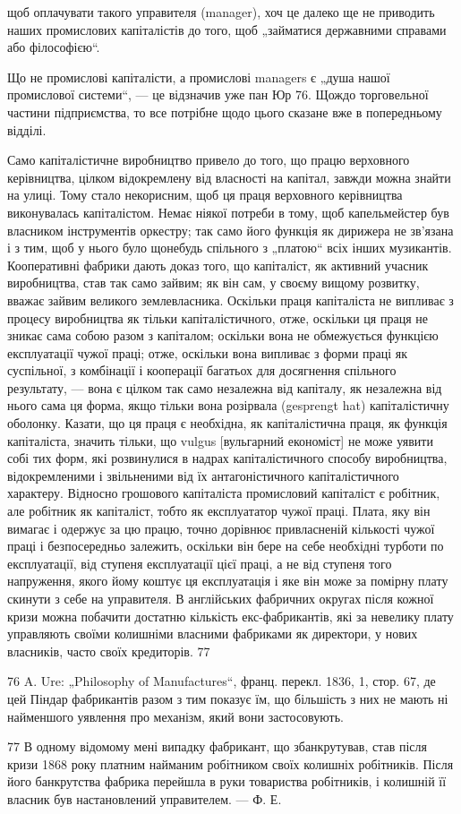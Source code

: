 щоб оплачувати такого управителя (manager), хоч це далеко
ще не приводить наших промислових капіталістів до того, щоб
„займатися державними справами або філософією“.

Що не промислові капіталісти, а промислові managers є „душа
нашої промислової системи“, — це відзначив уже пан Юр 76.
Щождо торговельної частини підприємства, то все потрібне
щодо цього сказане вже в попередньому відділі.

Само капіталістичне виробництво привело до того, що працю
верховного керівництва, цілком відокремлену від власності на капітал,
завжди можна знайти на улиці. Тому стало некорисним, щоб ця
праця верховного керівництва виконувалась капіталістом. Немає
ніякої потреби в тому, щоб капельмейстер був власником інструментів
оркестру; так само його функція як дирижера не зв’язана і з тим,
щоб у нього було щонебудь спільного з „платою“ всіх інших музикантів.
Кооперативні фабрики дають доказ того, що капіталіст, як
активний учасник виробництва, став так само зайвим; як він сам,
у своєму вищому розвитку, вважає зайвим великого землевласника.
Оскільки праця капіталіста не випливає з процесу виробництва
як тільки капіталістичного, отже, оскільки ця праця не
зникає сама собою разом з капіталом; оскільки вона не обмежується
функцією експлуатації чужої праці; отже, оскільки вона
випливає з форми праці як суспільної, з комбінації і кооперації
багатьох для досягнення спільного результату, — вона є цілком так
само незалежна від капіталу, як незалежна від нього сама ця форма,
якщо тільки вона розірвала (gesprengt hat) капіталістичну оболонку.
Казати, що ця праця є необхідна, як капіталістична праця,
як функція капіталіста, значить тільки, що vulgus [вульгарний
економіст] не може уявити собі тих форм, які розвинулися
в надрах капіталістичного способу виробництва, відокремленими
і звільненими від їх антагоністичного капіталістичного характеру.
Відносно грошового капіталіста промисловий капіталіст
є робітник, але робітник як капіталіст, тобто як експлуататор
чужої праці. Плата, яку він вимагає і одержує за цю працю,
точно дорівнює привласненій кількості чужої праці і безпосередньо
залежить, оскільки він бере на себе необхідні турботи по
експлуатації, від ступеня експлуатації цієї праці, а не від ступеня
того напруження, якого йому коштує ця експлуатація і яке він може
за помірну плату скинути з себе на управителя. В англійських
фабричних округах після кожної кризи можна побачити достатню
кількість екс-фабрикантів, які за невелику плату управляють
своїми колишніми власними фабриками як директори, у нових власників,
часто своїх кредиторів. 77

76    A. Ure: „Philosophy of Manufactures“, франц. перекл. 1836, 1, стор. 67,
де цей Піндар фабрикантів разом з тим показує їм, що більшість з них не
мають ні найменшого уявлення про механізм, який вони застосовують.

77 В одному відомому мені випадку фабрикант, що збанкрутував, став після
кризи 1868 року платним найманим робітником своїх колишніх робітників. Після
його банкрутства фабрика перейшла в руки товариства робітників, і колишній
її власник був настановлений управителем. — Ф. Е.
